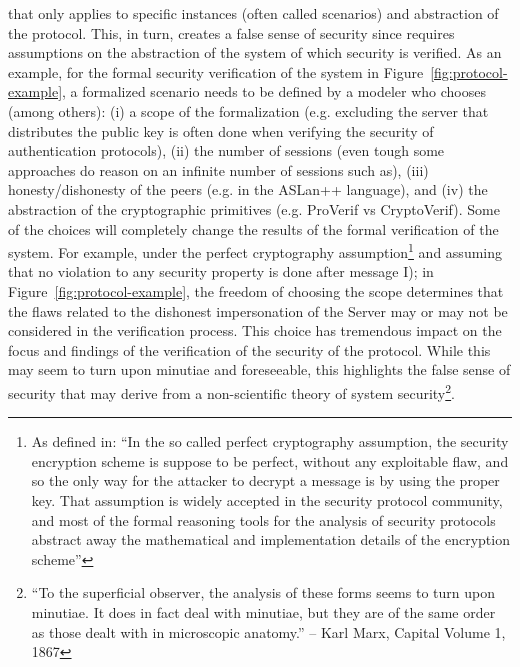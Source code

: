 \documentclass{article}
\theoremstyle{definition}
\theoremstyle{corollary}
\theoremstyle{lemma}
\theoremstyle{theorem}
\theoremstyle{theorem}
\begin{document}
that only applies to specific instances (often called scenarios) and
abstraction of the protocol. This, in turn, creates a false sense of security
since requires assumptions on the abstraction of the system of which security
is verified. As an example, for the formal security verification of the system
in Figure~\ref{fig:protocol-example}, a formalized scenario needs to be defined
by a modeler who chooses (among others): (i) a scope of the formalization (e.g.
excluding the server that distributes the public key is often done when
verifying the security of authentication protocols), (ii) the number of
sessions (even tough some approaches do reason on an infinite number of
sessions such as\autocite{Escobar2007maudenpa}), (iii) honesty/dishonesty of
the peers (e.g.  in the ASLan++ language\autocite{Oheimb2010aslan++}), and (iv)
the abstraction of the cryptographic primitives (e.g.  ProVerif vs
CryptoVerif\autocite{Blanchet2017symbolic}).  Some of the choices will
completely change the results of the formal verification of the system. For
example, under the perfect cryptography assumption\footnote{As defined
in\autocite{Rocchetto2016cpdy}: ``In the so called perfect cryptography
assumption, the security encryption scheme is suppose to be perfect, without
any exploitable flaw, and so the only way for the attacker to decrypt a message
is by using the proper key. That assumption is widely accepted in the security
protocol community, and most of the formal reasoning tools for the analysis of
security protocols abstract away the mathematical and implementation details of
the encryption
scheme\autocite{Turuani2006clatse,Basin2005ofmc,Armando2016satmc,Rocchetto2017interpolation}''}
and assuming that no violation to any security property is done after message
I); in Figure~\ref{fig:protocol-example}, the freedom of choosing the scope
determines that the flaws related to the dishonest impersonation of the Server
may or may not be considered in the verification process.  This choice has
tremendous impact on the focus and findings of the verification of the security
of the protocol.  While this may seem to turn upon minutiae and foreseeable,
this highlights the false sense of security that may derive from a
non-scientific theory of system security\footnote{``To the superficial
observer, the analysis of these forms seems to turn upon minutiae. It does in
fact deal with minutiae, but they are of the same order as those dealt with in
microscopic anatomy.'' -- Karl Marx, Capital Volume 1, 1867}.
\end{document}
